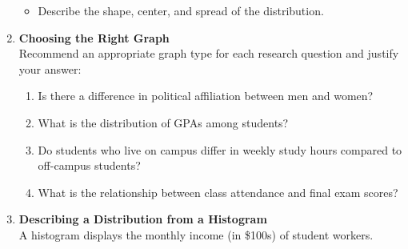 \documentclass{article}
\begin{document}
\begin{enumerate}
\begin{center}
\end{center}


    \begin{itemize}
        \item Describe the shape, center, and spread of the distribution.
    \end{itemize}

    \item \textbf{Choosing the Right Graph} \\
    Recommend an appropriate graph type for each research question and justify your answer:
    \begin{enumerate}
        \item Is there a difference in political affiliation between men and women?
        \item What is the distribution of GPAs among students?
        \item Do students who live on campus differ in weekly study hours compared to off-campus students?
        \item What is the relationship between class attendance and final exam scores?
    \end{enumerate}

    \item \textbf{Describing a Distribution from a Histogram} \\
    A histogram displays the monthly income (in \$100s) of student workers.

    \begin{center}
\end{center}
\end{enumerate}
\end{document}
